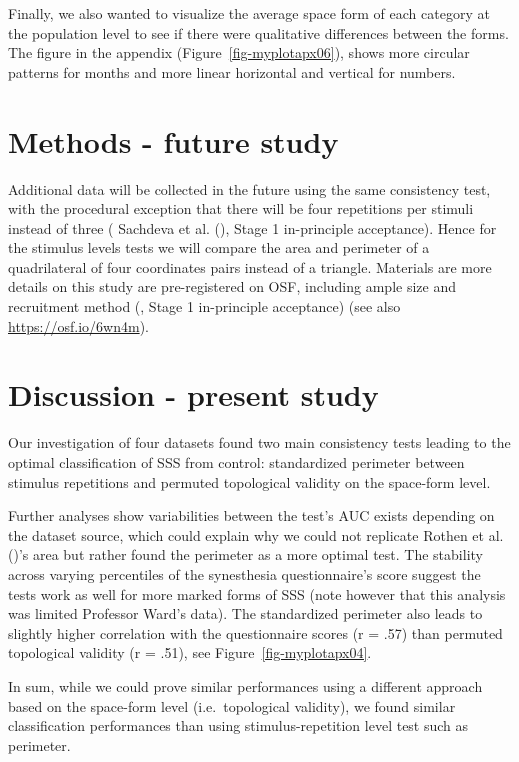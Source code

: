\documentclass[
  man,
  longtable,
  a4paper,
  nolmodern,
  notxfonts,
  notimes,
  colorlinks=true,linkcolor=blue,citecolor=blue,urlcolor=blue]{apa7}
\begin{document}
Finally, we also wanted to visualize the average space form of each
category at the population level to see if there were qualitative
differences between the forms. The figure in the appendix
(Figure~\ref{fig-myplotapx06}), shows more circular patterns for months
and more linear horizontal and vertical for numbers.

\section{Methods - future study}\label{sec-phase-ii-methods}

Additional data will be collected in the future using the same
consistency test, with the procedural exception that there will be four
repetitions per stimuli instead of three ( Sachdeva et al.
(), Stage 1 in-principle acceptance).
Hence for the stimulus levels tests we will compare the area and
perimeter of a quadrilateral of four coordinates pairs instead of a
triangle. Materials are more details on this study are pre-registered on
OSF, including ample size and recruitment method
(, Stage 1
in-principle acceptance) (see also \url{https://osf.io/6wn4m}).

\section{Discussion - present study}\label{discussion---present-study}

Our investigation of four datasets found two main consistency tests
leading to the optimal classification of SSS from control: standardized
perimeter between stimulus repetitions and permuted topological validity
on the space-form level.

Further analyses show variabilities between the test's AUC exists
depending on the dataset source, which could explain why we could not
replicate Rothen et al. ()'s area but
rather found the perimeter as a more optimal test. The stability across
varying percentiles of the synesthesia questionnaire's score suggest the
tests work as well for more marked forms of SSS (note however that this
analysis was limited Professor Ward's data). The standardized perimeter
also leads to slightly higher correlation with the questionnaire scores
(r = .57) than permuted topological validity (r = .51), see
Figure~\ref{fig-myplotapx04}.

In sum, while we could prove similar performances using a different
approach based on the space-form level (i.e.~topological validity), we
found similar classification performances than using stimulus-repetition
level test such as perimeter.
\end{document}
